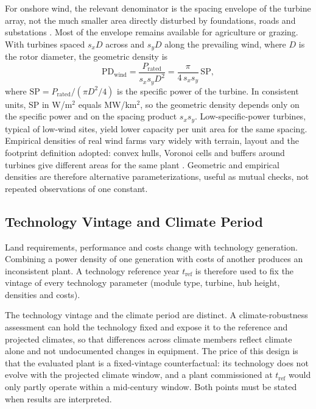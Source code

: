 For onshore wind, the relevant denominator is the spacing envelope of
the turbine array, not the much smaller area directly disturbed by
foundations, roads and substations
\cite{harrisonatlas2022,mckenna2022}. Most of the envelope remains
available for agriculture or grazing. With turbines spaced $s_x D$
across and $s_y D$ along the prevailing wind, where $D$ is the rotor
diameter, the geometric density is
\begin{equation}
    \mathrm{PD}_{\mathrm{wind}}
    = \frac{P_{\mathrm{rated}}}{s_x s_y D^2}
    = \frac{\pi}{4\,s_x s_y}\,\mathrm{SP},
    \label{eq:theory_wind_pd}
\end{equation}
where $\mathrm{SP}=P_{\mathrm{rated}}/(\pi D^2/4)$ is the specific power
of the turbine. In consistent units, SP in W/m$^2$ equals MW/km$^2$, so
the geometric density depends only on the specific power and on the
spacing product $s_x s_y$. Low-specific-power turbines, typical of
low-wind sites, yield lower capacity per unit area for the same spacing.
Empirical densities of real wind farms vary widely with terrain, layout
and the footprint definition adopted: convex hulls, Voronoi cells and
buffers around turbines give different areas for the same plant
\cite{harrisonatlas2022,turkovska2021,turkovska2024}. Geometric and
empirical densities are therefore alternative parameterizations, useful
as mutual checks, not repeated observations of one constant.

\subsection{Technology Vintage and Climate Period}
\label{subsec:technology_vintage}

Land requirements, performance and costs change with technology
generation. Combining a power density of one generation with costs of
another produces an inconsistent plant. A technology reference year
$t_{\mathrm{ref}}$ is therefore used to fix the vintage of every
technology parameter (module type, turbine, hub height, densities and
costs).

The technology vintage and the climate period are distinct. A
climate-robustness assessment can hold the technology fixed and expose
it to the reference and projected climates, so that differences across
climate members reflect climate alone and not undocumented changes in
equipment. The price of this design is that the evaluated plant is a
fixed-vintage counterfactual: its technology does not evolve with the
projected climate window, and a plant commissioned at
$t_{\mathrm{ref}}$ would only partly operate within a mid-century
window. Both points must be stated when results are interpreted.

